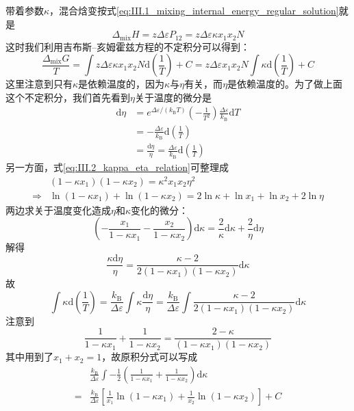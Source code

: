 \documentclass[main.tex]{subfiles}
\begin{document}
带着参数$\kappa$，混合焓变按式\eqref{eq:III.1_mixing_internal_energy_regular_solution}就是
\[\Delta_\text{mix}H=z\Delta\varepsilon P_{12}=z\Delta\varepsilon\kappa x_1x_2N\]
这时我们利用吉布斯--亥姆霍兹方程的不定积分可以得到：
\[\frac{\Delta_\text{mix}G}{T}=\int z\Delta\varepsilon\kappa x_1x_2N\mathrm{d}\left(\frac{1}{T}\right)+C=z\Delta\varepsilon x_1 x_2 N\int\kappa\mathrm{d}\left(\frac{1}{T}\right)+C \]
这里注意到只有$\kappa$是依赖温度的，因为$\kappa$与$\eta$有关，而$\eta$是依赖温度的。为了做上面这个不定积分，我们首先看到$\eta$关于温度的微分是
\begin{align*}
  \mathrm{d}\eta & =e^{\Delta\varepsilon/\left(k_\text{B}T\right)}\left(-\frac{1}{T^2}\right)\frac{\Delta\varepsilon}{k_\text{B}}\mathrm{d}T \\&=-\frac{\Delta\varepsilon}{k_\text{B}}\mathrm{d}\left(\frac{1}{T}\right)\\&=\frac{\mathrm{d}\eta}{\eta}=\frac{\Delta\varepsilon}{k_\text{B}}\mathrm{d}\left(\frac{1}{T}\right)
\end{align*}
另一方面，式\eqref{eq:III.2_kappa_eta_relation}可整理成
\begin{align*}             & \left(1-\kappa x_1\right)\left(1-\kappa x_2\right)=\kappa^2x_1x_2\eta^2 \\\Rightarrow&\ln\left(1-\kappa x_1\right)+\ln\left(1-\kappa x_2\right)=2\ln\kappa+\ln x_1+\ln x_2+2\ln\eta
\end{align*}
两边求关于温度变化造成$\eta$和$\kappa$变化的微分：
\[\left(-\frac{x_1}{1-\kappa x_1}-\frac{x_2}{1-\kappa x_2}\right)\mathrm{d}\kappa=\frac{2}{\kappa}\mathrm{d}\kappa+\frac{2}{\eta}\mathrm{d}\eta\]
解得
\[\frac{\kappa\mathrm{d}\eta}{\eta}=\frac{\kappa-2}{2\left(1-\kappa x_1\right)\left(1-\kappa x_2\right)}\mathrm{d}\kappa\]
故
\[\int\kappa\mathrm{d}\left(\frac{1}{T}\right)=\frac{k_\text{B}}{\Delta\varepsilon}\int\kappa\frac{\mathrm{d}\eta}{\eta}=\frac{k_\text{B}}{\Delta\varepsilon}\int\frac{\kappa-2}{2\left(1-\kappa x_1\right)\left(1-\kappa x_2\right)}\mathrm{d}\kappa\]
注意到
\[\frac{1}{1-\kappa x_1}+\frac{1}{1-\kappa x_2}=\frac{2-\kappa}{\left(1-\kappa x_1\right)\left(1-\kappa x_2\right)}\]
其中用到了$x_1+x_2=1$，故原积分式可以写成
\begin{align*}
    & \frac{k_\text{B}}{\Delta\varepsilon}\int-\frac{1}{2}\left(\frac{1}{1-\kappa x_1}+\frac{1}{1-\kappa x_2}\right)\mathrm{d}\kappa         \\
  = & \frac{k_\text{B}}{\Delta\varepsilon}\left[\frac{1}{x_1}\ln\left(1-\kappa x_1\right)+\frac{1}{x_2}\ln\left(1-\kappa x_2\right)\right]+C
\end{align*}
\end{document}
